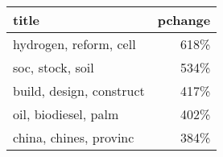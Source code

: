\begin{tabular}{p{1.2cm}r}
\toprule
                    title &  pchange \\
\midrule
   hydrogen, reform, cell &     618\% \\
         soc, stock, soil &     534\% \\
 build, design, construct &     417\% \\
     oil, biodiesel, palm &     402\% \\
   china, chines, provinc &     384\% \\
\bottomrule
\end{tabular}
